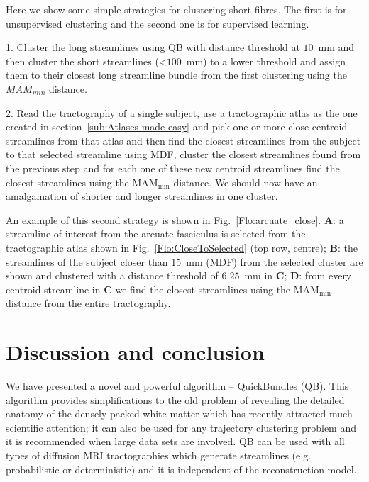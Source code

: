 \documentclass{bioinfo}
\begin{document}
Here we show some simple strategies for clustering short fibres. The
first is for unsupervised clustering and the second one is for
supervised learning.

1. Cluster the long streamlines using QB with distance threshold at
$10$~mm and then cluster the short streamlines (<$100$~mm) to a lower
threshold and assign them to their closest long streamline bundle from
the first clustering using the $MAM_{min}$ distance.

2. Read the tractography of a single subject, use a tractographic atlas
as the one created in section~\ref{sub:Atlases-made-easy} and pick one
or more close centroid streamlines from that atlas and then find the
closest streamlines from the subject to that selected streamline using
MDF, cluster the closest streamlines found from the previous step and
for each one of these new centroid streamlines find the closest
streamlines using the $\textrm{MAM}_{\textrm{min}}$ distance. We should
now have an amalgamation of shorter and longer streamlines in one
cluster.

An example of this second strategy is shown in
Fig.~\ref{Flo:arcuate_close}. \textbf{A}: a streamline of interest from
the arcuate fasciculus is selected from the tractographic atlas shown in
Fig.~\ref{Flo:CloseToSelected} (top row, centre); \textbf{B}: the
streamlines of the subject closer than 15~mm (MDF) from the selected
cluster are shown and clustered with a distance threshold of $6.25$~mm
in \textbf{C}; \textbf{D}: from every centroid streamline in \textbf{C}
we find the closest streamlines using the $\textrm{MAM}_{\textrm{min}}$
distance from the entire tractography.

\section{Discussion and conclusion}

We have presented a novel and powerful algorithm -- QuickBundles
(QB). This algorithm provides simplifications to the old problem of
revealing the detailed anatomy of the densely packed white matter which
has recently attracted much scientific attention; it can also be used
for any trajectory clustering problem and it is recommended when large
data sets are involved. QB can be used with all types of diffusion MRI
tractographies which generate streamlines (e.g. probabilistic or
deterministic) and it is independent of the reconstruction model.
\end{document}
